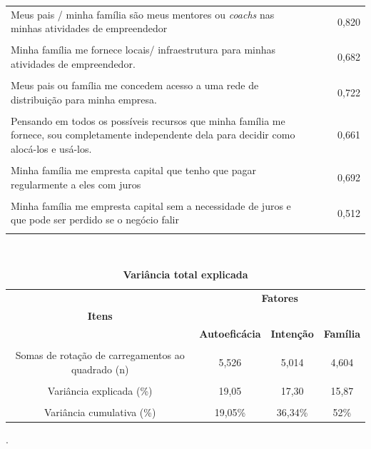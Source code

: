 \begin{center}
\begin{longtable}{p{6cm} c c c }
Meus pais / minha família são meus mentores ou \textit{coachs} nas minhas atividades de empreendedor
 &  & & 0,820 \\\\
 
Minha família me fornece locais/ infraestrutura para minhas atividades de empreendedor.
 &  & & 0,682 \\\\
 
Meus pais ou família me concedem acesso a uma rede de distribuição para minha empresa.
 &  & & 0,722 \\\\
 
 Pensando em todos os possíveis recursos que minha família me fornece, sou completamente independente dela para decidir como alocá-los e usá-los.
 &  & & 0,661 \\\\
 
Minha família me empresta capital que  tenho que pagar regularmente a eles com juros		
 &  & & 0,692 \\\\
 
Minha família me empresta capital sem a necessidade de juros e que pode ser perdido se o negócio falir
 & & & 0,512 \\\\ \hline 
 
\end{longtable}
\end{center}



\begin{table}[!htb]
 \label{tabela_4}
 \centering
\caption{\textbf{Variância total explicada}}
 \\ \hline\hline
\begin{tabular}{c c c c }
\multicolumn{1}{p{6cm}}{} & \multicolumn{3}{c}{\textbf{Fatores}}\\ 
 \multicolumn{1}{c}{\textbf{Itens}} & \multicolumn{3}{c}{\hrulefill}\\ 

 \multicolumn{1}{c}{} 
 &\multicolumn{1}{c}{\textbf{Autoeficácia}} & \multicolumn{1}{c}{\textbf{Intenção}} &\multicolumn{1}{c}{\textbf{Família}}  
\\\\ \hline 

 Somas de rotação de carregamentos ao quadrado (n)
 & 5,526 & 5,014 & 4,604 \\\\
 Variância explicada (\%)
 & 19,05 & 17,30 &15,87\\\\
 Variância cumulativa (\%)
 & 19,05\% & 36,34\% &52\% \\\hline \hline 
 
\end{tabular}
.
\end{table}



